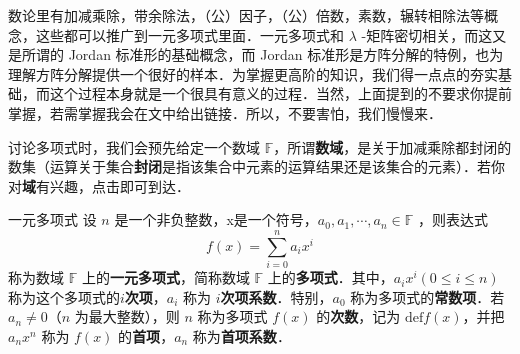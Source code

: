 
数论里有加减乘除，带余除法，（公）因子，（公）倍数，素数，辗转相除法等概念，这些都可以推广到一元多项式里面．一元多项式和 $\lambda$ -矩阵密切相关，而这又是所谓的 Jordan 标准形的基础概念，而 Jordan 标准形是方阵分解的特例，也为理解方阵分解提供一个很好的样本．为掌握更高阶的知识，我们得一点点的夯实基础，而这个过程本身就是一个很具有意义的过程．当然，上面提到的不要求你提前掌握，若需掌握我会在文中给出链接．所以，不要害怕，我们慢慢来．

讨论多项式时，我们会预先给定一个数域 $\mathbb{F}$，所谓\textbf{数域}，是关于加减乘除都封闭的数集（运算关于集合\textbf{封闭}是指该集合中元素的运算结果还是该集合的元素）．若你对\textbf{域}有兴趣，点击即可到达．
\begin{definition}{一元多项式}
设 $n$ 是一个非负整数，x是一个符号，$a_0,a_1,\cdots,a_n\in \mathbb{F}$ ，则表达式
\begin{equation}
f(x)=\sum_{i=0}^{n}a_i x^i
\end{equation}
称为数域 $\mathbb{F}$ 上的\textbf{一元多项式}，简称数域 $\mathbb{F}$ 上的\textbf{多项式}．其中，$a_ix^i(0\leq i\leq n)$ 称为这个多项式的\textbf{$i$次项}，$a_i$ 称为 \textbf{$i$次项系数}．特别，$a_0$ 称为多项式的\textbf{常数项}．若 $a_n\neq 0$（$n$ 为最大整数），则 $n$ 称为多项式 $f(x)$ 的\textbf{次数}，记为 $\mathrm{def}f(x)$，并把 $a_nx^n$ 称为 $f(x)$ 的\textbf{首项}，$a_n$ 称为\textbf{首项系数}．
\end{definition}
